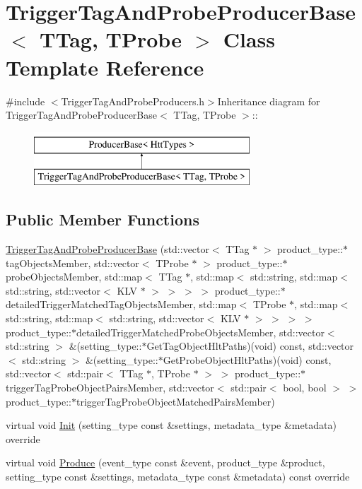 \hypertarget{classTriggerTagAndProbeProducerBase}{
\section{TriggerTagAndProbeProducerBase$<$ TTag, TProbe $>$ Class Template Reference}
\label{classTriggerTagAndProbeProducerBase}
}


{\ttfamily \#include $<$TriggerTagAndProbeProducers.h$>$}Inheritance diagram for TriggerTagAndProbeProducerBase$<$ TTag, TProbe $>$::\begin{figure}[H]
\begin{center}
\leavevmode
\includegraphics[height=2cm]{classTriggerTagAndProbeProducerBase}
\end{center}
\end{figure}
\subsection*{Public Member Functions}
\begin{DoxyCompactItemize}
\item 
\hyperlink{classTriggerTagAndProbeProducerBase_a26dbb7f3ee7adb10446ef47905099e47}{TriggerTagAndProbeProducerBase} (std::vector$<$ TTag $\ast$ $>$ product\_\-type::$\ast$tagObjectsMember, std::vector$<$ TProbe $\ast$ $>$ product\_\-type::$\ast$probeObjectsMember, std::map$<$ TTag $\ast$, std::map$<$ std::string, std::map$<$ std::string, std::vector$<$ KLV $\ast$ $>$ $>$ $>$ $>$ product\_\-type::$\ast$detailedTriggerMatchedTagObjectsMember, std::map$<$ TProbe $\ast$, std::map$<$ std::string, std::map$<$ std::string, std::vector$<$ KLV $\ast$ $>$ $>$ $>$ $>$ product\_\-type::$\ast$detailedTriggerMatchedProbeObjectsMember, std::vector$<$ std::string $>$ \&(setting\_\-type::$\ast$GetTagObjectHltPaths)(void) const, std::vector$<$ std::string $>$ \&(setting\_\-type::$\ast$GetProbeObjectHltPaths)(void) const, std::vector$<$ std::pair$<$ TTag $\ast$, TProbe $\ast$ $>$ $>$ product\_\-type::$\ast$triggerTagProbeObjectPairsMember, std::vector$<$ std::pair$<$ bool, bool $>$ $>$ product\_\-type::$\ast$triggerTagProbeObjectMatchedPairsMember)
\item 
virtual void \hyperlink{classTriggerTagAndProbeProducerBase_a4f9cd9ab107167a635112c38cf2b416c}{Init} (setting\_\-type const \&settings, metadata\_\-type \&metadata) override
\item 
virtual void \hyperlink{classTriggerTagAndProbeProducerBase_a310f761a30108b660bf8232fdf398e3c}{Produce} (event\_\-type const \&event, product\_\-type \&product, setting\_\-type const \&settings, metadata\_\-type const \&metadata) const override
\end{DoxyCompactItemize}
